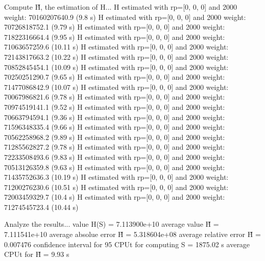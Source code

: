 Compute H̃, the estimation of H...
  H estimated with rp=[0, 0, 0] and 2000 weight:  70160207640.9  (9.8 s)
  H estimated with rp=[0, 0, 0] and 2000 weight:  70726818752.1  (9.79 s)
  H estimated with rp=[0, 0, 0] and 2000 weight:  71822316664.4  (9.95 s)
  H estimated with rp=[0, 0, 0] and 2000 weight:  71063657259.6  (10.11 s)
  H estimated with rp=[0, 0, 0] and 2000 weight:  72143817663.2  (10.22 s)
  H estimated with rp=[0, 0, 0] and 2000 weight:  70852845454.1  (10.09 s)
  H estimated with rp=[0, 0, 0] and 2000 weight:  70250251290.7  (9.65 s)
  H estimated with rp=[0, 0, 0] and 2000 weight:  71477086842.9  (10.07 s)
  H estimated with rp=[0, 0, 0] and 2000 weight:  70067986821.6  (9.78 s)
  H estimated with rp=[0, 0, 0] and 2000 weight:  70974519141.1  (9.52 s)
  H estimated with rp=[0, 0, 0] and 2000 weight:  70663794594.1  (9.36 s)
  H estimated with rp=[0, 0, 0] and 2000 weight:  71596348335.4  (9.66 s)
  H estimated with rp=[0, 0, 0] and 2000 weight:  70562258968.2  (9.89 s)
  H estimated with rp=[0, 0, 0] and 2000 weight:  71285562827.2  (9.78 s)
  H estimated with rp=[0, 0, 0] and 2000 weight:  72233508493.6  (9.83 s)
  H estimated with rp=[0, 0, 0] and 2000 weight:  70513126359.8  (9.63 s)
  H estimated with rp=[0, 0, 0] and 2000 weight:  71435752636.3  (10.19 s)
  H estimated with rp=[0, 0, 0] and 2000 weight:  71200276230.6  (10.51 s)
  H estimated with rp=[0, 0, 0] and 2000 weight:  72003459329.7  (10.4 s)
  H estimated with rp=[0, 0, 0] and 2000 weight:  71274545723.4  (10.44 s)

Analyze the results...
  value H(S)                  = 7.113900e+10 
  average value H̃             = 7.111541e+10 
  average absolue error H̃     = 5.318604e+08 
  average relative error H̃    = 0.007476 
  confidence interval for 95%
  CPUt for computing S         = 1875.02 s
  average CPUt for H̃           = 9.93 s

